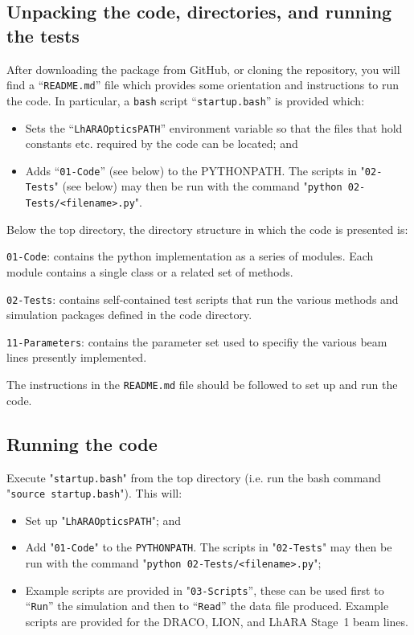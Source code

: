 \subsection*{Unpacking the code, directories, and running the tests}
After downloading the package from GitHub, or cloning the repository,
you will find a ``\verb+README.md+'' file which provides some orientation
and instructions to run the code.
In particular, a \verb+bash+ script ``\verb+startup.bash+'' is
provided which:
\begin{itemize}
  \item Sets the ``\verb+LhARAOpticsPATH+'' environment variable
    so that the files that hold constants etc. required by the code
    can be located; and
  \item Adds ``\verb+01-Code+'' (see below) to the PYTHONPATH.
    The scripts in "\verb+02-Tests+" (see below) may then be run with
    the command "\verb+python 02-Tests/<filename>.py+".
\end{itemize}
Below the top directory, the directory structure in which the code is
presented is:
\begin{description}
  \item\verb+01-Code+: contains the python implementation as a
    series of modules.
    Each module contains a single class or a related set of methods.
  \item\verb+02-Tests+: contains self-contained test scripts that
    run the various methods and simulation packages defined in the
    code directory.
  \item\verb+11-Parameters+: contains the parameter set used to 
    specifiy the various beam lines presently implemented.
\end{description}
The instructions in the \verb+README.md+ file should be followed to set
up and run the code.

\subsection*{Running the code}
Execute "\verb+startup.bash+" from the top directory (i.e. run the
bash command "\verb+source startup.bash+").  This will:
\begin{itemize}
  \item Set up "\verb+LhARAOpticsPATH+"; and
  \item Add "\verb+01-Code+" to the \verb+PYTHONPATH+.
    The scripts in "\verb+02-Tests+" may then be run with the command
    "\verb+python 02-Tests/<filename>.py+"; 
  \item Example scripts are provided in "\verb+03-Scripts+'', these
    can be used first to ``\verb+Run+'' the simulation and then to
    ``\verb+Read+'' the data file produced.
    Example scripts are provided for the DRACO, LION, and LhARA
    Stage~1 beam lines.
\end{itemize}

